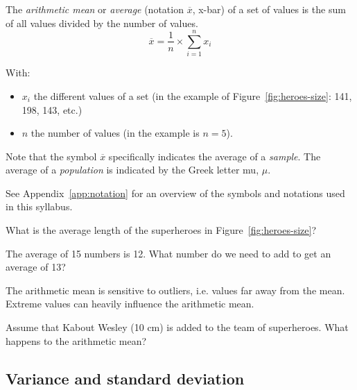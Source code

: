 \begin{definition}
    \label{def:mean}
    
    The \emph{arithmetic mean} or \emph{average} (notation $\overline{x}$, x-bar) of a set of values is the sum of all values divided by the number of values.
    \begin{equation}
    \overline{x} = \frac{1}{n} \times \sum_{i=1}^{n} x_{i}
    \label{eq:Mean}
    \end{equation}
    
    With:
    \begin{itemize}
        \item $x_{i}$ the different values of a set (in the example of Figure~\ref{fig:heroes-size}: 141, 198, 143, etc.)
        \item $n$ the number of values (in the example is $n = 5$).
    \end{itemize}
\end{definition}

\begin{remark}[!!]
    Note that the symbol $\overline{x}$ specifically indicates the average of a \emph{sample}.
    The average of a \emph{population} is indicated by the Greek letter mu, $\mu $.
    
    See Appendix~\ref {app:notation} for an overview of the symbols and notations used in this syllabus.
\end{remark}

\begin{exercise}
    What is the average length of the superheroes in Figure~\ref{fig:heroes-size}?
\end{exercise}

\begin{exercise}
    The average of 15 numbers is 12. What number do we need to add to get an average of 13?
\end{exercise}

\begin{exercise}
    The arithmetic mean is sensitive to outliers, i.e. values far away from the mean. Extreme values can heavily influence the arithmetic mean.
    
    Assume that Kabout Wesley (10 cm) is added to the team of superheroes. What happens to the arithmetic mean?
\end{exercise}

\subsection{Variance and standard deviation}
\label{ssec:variance-and-standard-deviation}

